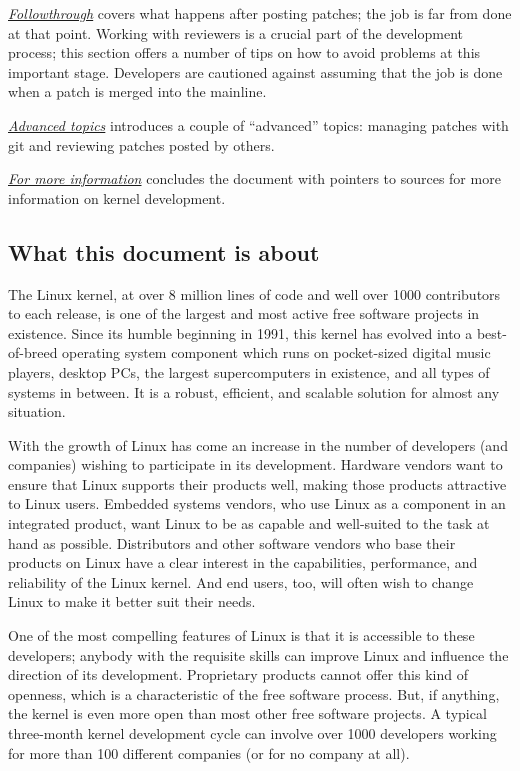 \documentclass[a4paper,8pt,english]{sphinxmanual}
\begin{document}
{\hyperref[process/6.Followthrough:development\string-followthrough]{\emph{Followthrough}}} covers what happens after posting patches; the
job is far from done at that point.  Working with reviewers is a crucial part
of the development process; this section offers a number of tips on how to
avoid problems at this important stage.  Developers are cautioned against
assuming that the job is done when a patch is merged into the mainline.

{\hyperref[process/7.AdvancedTopics:development\string-advancedtopics]{\emph{Advanced topics}}} introduces a couple of ``advanced'' topics:
managing patches with git and reviewing patches posted by others.

{\hyperref[process/8.Conclusion:development\string-conclusion]{\emph{For more information}}} concludes the document with pointers to sources
for more information on kernel development.


\subsection{What this document is about}
\label{process/1.Intro:what-this-document-is-about}
The Linux kernel, at over 8 million lines of code and well over 1000
contributors to each release, is one of the largest and most active free
software projects in existence.  Since its humble beginning in 1991, this
kernel has evolved into a best-of-breed operating system component which
runs on pocket-sized digital music players, desktop PCs, the largest
supercomputers in existence, and all types of systems in between.  It is a
robust, efficient, and scalable solution for almost any situation.

With the growth of Linux has come an increase in the number of developers
(and companies) wishing to participate in its development.  Hardware
vendors want to ensure that Linux supports their products well, making
those products attractive to Linux users.  Embedded systems vendors, who
use Linux as a component in an integrated product, want Linux to be as
capable and well-suited to the task at hand as possible.  Distributors and
other software vendors who base their products on Linux have a clear
interest in the capabilities, performance, and reliability of the Linux
kernel.  And end users, too, will often wish to change Linux to make it
better suit their needs.

One of the most compelling features of Linux is that it is accessible to
these developers; anybody with the requisite skills can improve Linux and
influence the direction of its development.  Proprietary products cannot
offer this kind of openness, which is a characteristic of the free software
process.  But, if anything, the kernel is even more open than most other
free software projects.  A typical three-month kernel development cycle can
involve over 1000 developers working for more than 100 different companies
(or for no company at all).
\end{document}
